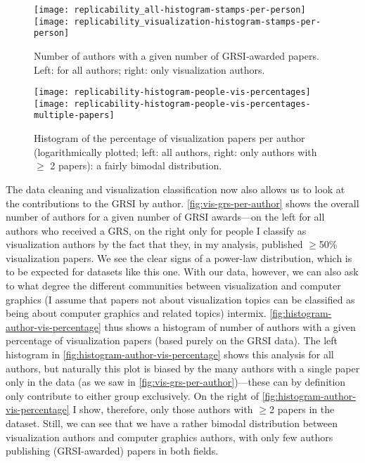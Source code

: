 \documentclass[conference]{vgtc}                     %
\begin{document}
\begin{figure}
	\centering
	\texttt{[image: replicability\_all-histogram-stamps-per-person]}\hfill%
	\texttt{[image: replicability\_visualization-histogram-stamps-per-person]}%
	\caption{Number of authors with a given number of GRSI-awarded papers. Left: for all authors; right: only visualization authors.}
	\label{fig:vis-grs-per-author}
\end{figure}

\begin{figure}
	\centering
	\texttt{[image: replicability-histogram-people-vis-percentages]}\hfill%
	\texttt{[image: replicability-histogram-people-vis-percentages-multiple-papers]}%
	\caption{Histogram of the percentage of visualization papers per author (logarithmically plotted; left: all authors, right: only authors with $\geq$ 2 papers): a fairly bimodal distribution.}
	\label{fig:histogram-author-vis-percentage}
\end{figure}

The data cleaning and visualization classification now also allows us to look at the contributions to the GRSI by author. \autoref{fig:vis-grs-per-author} shows the overall number of authors for a given number of GRSI awards---on the left for all authors who received a GRS, on the right only for people I classify as visualization authors by the fact that they, in my analysis, published $\geq$50\% visualization papers. We see the clear signs of a power-law distribution, which is to be expected for datasets like this one. With our data, however, we can also ask to what degree the different communities between visualization and computer graphics (I assume that papers not about visualization topics can be classified as being about computer graphics and related topics) intermix. \autoref{fig:histogram-author-vis-percentage} thus shows a histogram of number of authors with a given percentage of visualization papers (based purely on the GRSI data). The left histogram in \autoref{fig:histogram-author-vis-percentage} shows this analysis for all authors, but naturally this plot is biased by the many authors with a single paper only in the data (as we saw in \autoref{fig:vis-grs-per-author})---these can by definition only contribute to either group exclusively. On the right of \autoref{fig:histogram-author-vis-percentage} I show, therefore, only those authors with $\geq$2 papers in the dataset. Still, we can see that we have a rather bimodal distribution between visualization authors and computer graphics authors, with only few authors publishing (GRSI-awarded) papers in both fields.
\end{document}
